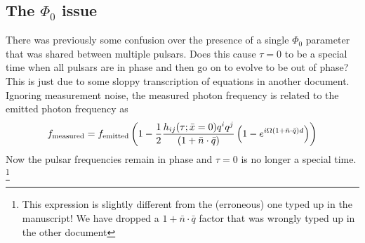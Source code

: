 \documentclass{tufte-handout} %
\begin{document}
\subsection{The $\Phi_0$ issue}
There was previously some confusion over the presence of a single $\Phi_0$ parameter that was shared between multiple pulsars. Does this cause $\tau = 0$ to be a special time when all pulsars are in phase and then go on to evolve to be out of phase? This is just due to some sloppy transcription of equations in another document. Ignoring measurement noise, the measured photon frequency is related to the emitted photon frequency  as
\begin{equation}
	f_{\rm measured} = f_{\rm emitted} \left(1 - \frac{1}{2} \frac{ h_{ij} (\tau; \bar{x}= 0)q^i q^j }{(1 + \bar{n}\cdot \bar{q}) }  \left(1 -e^{i \Omega (1 + \bar{n}\cdot \bar{q})  d}\right) \right)
\end{equation}
Now the pulsar frequencies remain in phase and $\tau=0$ is no longer a special time. \footnote{This expression is slightly different from the (erroneous) one typed up in the manuscript! We have dropped a $1+ \bar{n} \cdot \bar{q}$ factor that was wrongly typed up in the other document}


 
\end{document}

